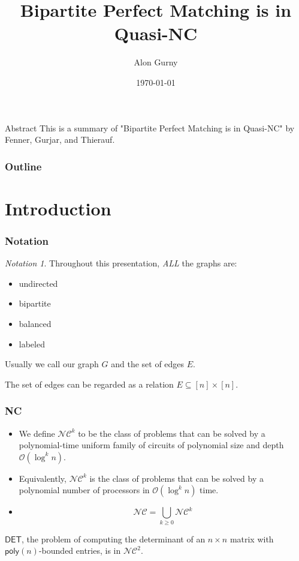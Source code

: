 \documentclass{beamer}
\title{Bipartite Perfect Matching is in Quasi-NC}
\author{Alon Gurny}
\date{\today}
\theoremstyle{remark}
\newtheorem{notation}{Notation}
\newcommand{\nc}{{\mathcal{NC}}}
\newcommand{\OO}{\mathcal{O}}
\begin{document}
\frame{\titlepage}

\begin{frame}
  \begin{block}{Abstract}
    This is a summary of "Bipartite Perfect Matching is in Quasi-NC" by Fenner, Gurjar, and Thierauf.
  \end{block}
  \frametitle{Outline}
  \tableofcontents
\end{frame}

\section{Introduction}

% 

\begin{frame}
  \frametitle{Notation}

  \begin{notation}

    Throughout this presentation, \emph{ALL} the graphs are:
    \begin{itemize}
      \item undirected
      \item bipartite
      \item balanced
      \item labeled
    \end{itemize}

    Usually we call our graph $G$ and the set of edges $E$.

    The set of edges can be regarded as a relation $E \subseteq [n] \times [n]$.
  \end{notation}
\end{frame}

\begin{frame}
  \frametitle{NC}

  \begin{definition}
    \begin{itemize}
      \item We define $\nc^k$ to be the class of problems that can be solved
            by a polynomial-time uniform family of circuits of polynomial
            size and depth $\OO(\log^k n)$.
      \item Equivalently, $\nc^k$ is the class of problems that can be solved
            by a polynomial number of processors in $\OO(\log^k n)$ time.
      \item \[
              \nc = \bigcup_{k \ge 0} \nc^k
            \]
    \end{itemize}
  \end{definition}

  \begin{fact}
    $\mathsf{DET}$,
    the problem of computing the determinant of an $n \times n$ matrix
    with $\mathsf{poly}(n)$-bounded entries,
    is in $\nc^2$.
  \end{fact}
\end{frame}
\end{document}
